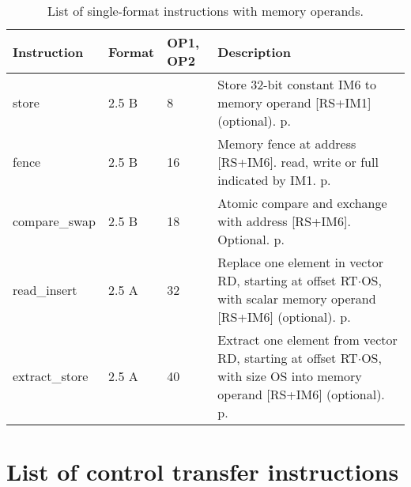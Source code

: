 \documentclass[forwardcom.tex]{subfiles}
\begin{document}
\begin{longtable} {|p{25mm}|p{14mm}|p{10mm}|p{95mm}|}
\caption{List of single-format instructions with memory operands.} 
\label{table:ListOfSingleFormatInstructionsMemory} \\
\endfirsthead
\endhead
\hline
\bfseries Instruction & \bfseries Format &\bfseries OP1, OP2 & \bfseries Description \\
\hline
store         & 2.5 B &  8 & Store 32-bit constant IM6 to memory operand [RS+IM1] (optional). p. \pageref{table:storeInstruction} \\

fence         & 2.5 B & 16 & Memory fence at address [RS+IM6]. read, write or full indicated by IM1. p. \pageref{table:fenceInstruction}\\

compare\_swap & 2.5 B & 18 & Atomic compare and exchange with address [RS+IM6]. Optional.  p. \pageref{table:compareSwapInstruction}\\

read\_insert  & 2.5 A & 32 & Replace one element in vector RD, starting at offset 
RT$\cdot$OS, with scalar memory operand [RS+IM6] (optional). p. \pageref{table:readInsertInstruction}  \\

extract\_store& 2.5 A & 40 & Extract one element from vector RD, starting at offset RT$\cdot$OS, with size OS into memory operand [RS+IM6] (optional). p. \pageref{table:extractStoreInstruction} \\

\hline
\end{longtable}
\vspace{4mm}



\section{List of control transfer instructions}
\end{document}
